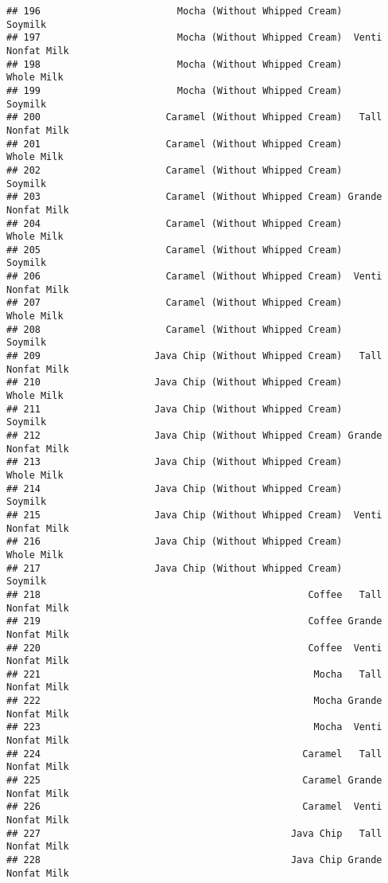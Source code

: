 \documentclass[
]{article}
\begin{document}
\begin{verbatim}
## 196                        Mocha (Without Whipped Cream)            Soymilk
## 197                        Mocha (Without Whipped Cream)  Venti Nonfat Milk
## 198                        Mocha (Without Whipped Cream)         Whole Milk
## 199                        Mocha (Without Whipped Cream)            Soymilk
## 200                      Caramel (Without Whipped Cream)   Tall Nonfat Milk
## 201                      Caramel (Without Whipped Cream)         Whole Milk
## 202                      Caramel (Without Whipped Cream)            Soymilk
## 203                      Caramel (Without Whipped Cream) Grande Nonfat Milk
## 204                      Caramel (Without Whipped Cream)         Whole Milk
## 205                      Caramel (Without Whipped Cream)            Soymilk
## 206                      Caramel (Without Whipped Cream)  Venti Nonfat Milk
## 207                      Caramel (Without Whipped Cream)         Whole Milk
## 208                      Caramel (Without Whipped Cream)            Soymilk
## 209                    Java Chip (Without Whipped Cream)   Tall Nonfat Milk
## 210                    Java Chip (Without Whipped Cream)         Whole Milk
## 211                    Java Chip (Without Whipped Cream)            Soymilk
## 212                    Java Chip (Without Whipped Cream) Grande Nonfat Milk
## 213                    Java Chip (Without Whipped Cream)         Whole Milk
## 214                    Java Chip (Without Whipped Cream)            Soymilk
## 215                    Java Chip (Without Whipped Cream)  Venti Nonfat Milk
## 216                    Java Chip (Without Whipped Cream)         Whole Milk
## 217                    Java Chip (Without Whipped Cream)            Soymilk
## 218                                               Coffee   Tall Nonfat Milk
## 219                                               Coffee Grande Nonfat Milk
## 220                                               Coffee  Venti Nonfat Milk
## 221                                                Mocha   Tall Nonfat Milk
## 222                                                Mocha Grande Nonfat Milk
## 223                                                Mocha  Venti Nonfat Milk
## 224                                              Caramel   Tall Nonfat Milk
## 225                                              Caramel Grande Nonfat Milk
## 226                                              Caramel  Venti Nonfat Milk
## 227                                            Java Chip   Tall Nonfat Milk
## 228                                            Java Chip Grande Nonfat Milk

\end{verbatim}
\end{document}
